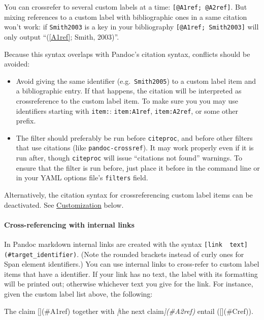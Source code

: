 \documentclass[
]{article}
\newenvironment{Shaded}{}{}
\newcommand{\CommentTok}[1]{\textcolor[rgb]{0.38,0.63,0.69}{\textit{#1}}}
\newcommand{\NormalTok}[1]{#1}
\newcommand{\OtherTok}[1]{\textcolor[rgb]{0.00,0.44,0.13}{#1}}
\providecommand{\tightlist}{%
  \setlength{\itemsep}{0pt}\setlength{\parskip}{0pt}}
\begin{document}
You can crossrefer to several custom labels at a time:
\texttt{{[}@A1ref;\ @A2ref{]}}. But mixing references to a custom label
with bibliographic ones in a same citation won't work: if
\texttt{Smith2003} is a key in your bibliography
\texttt{{[}@A1ref;\ Smith2003{]}} will only output ``(\ref{A1ref};
Smith, 2003)''.

Because this syntax overlaps with Pandoc's citation syntax, conflicts
should be avoided:

\begin{itemize}
\tightlist
\item
  Avoid giving the same identifier (e.g.~\texttt{Smith2005}) to a custom
  label item and a bibliographic entry. If that happens, the citation
  will be interpreted as crossreference to the custom label item. To
  make sure you you may use identifiers starting with \texttt{item:}:
  \texttt{item:A1ref}, \texttt{item:A2ref}, or some other prefix.
\item
  The filter should preferably be run before \texttt{citeproc}, and
  before other filters that use citations (like
  \texttt{pandoc-crossref}). It may work properly even if it is run
  after, though \texttt{citeproc} will issue ``citations not found''
  warnings. To ensure that the filter is run before, just place it
  before in the command line or in your YAML options file's
  \texttt{filters} field.
\end{itemize}

Alternatively, the citation syntax for crossreferencing custom label
items can be deactivated. See
\protect\hyperlink{customization}{Customization} below.

\hypertarget{cross-referencing-with-internal-links}{%
\paragraph{Cross-referencing with internal
links}\label{cross-referencing-with-internal-links}}

In Pandoc markdown internal links are created with the syntax
\texttt{{[}link\ \ text{]}(\#target\_identifier)}. (Note the rounded
brackets instead of curly ones for Span element identifiers.) You can
use internal links to cross-refer to custom label items that have a
identifier. If your link has no text, the label with its formatting will
be printed out; otherwise whichever text you give for the link. For
instance, given the custom label list above, the following:

\begin{Shaded}
\begin{Highlighting}[]
\NormalTok{The claim [](\#A1ref) together with }\CommentTok{[}\OtherTok{the next claim}\CommentTok{](\#A2ref)} 
\NormalTok{entail ([](\#Cref)).}
\end{Highlighting}
\end{Shaded}
\end{document}

